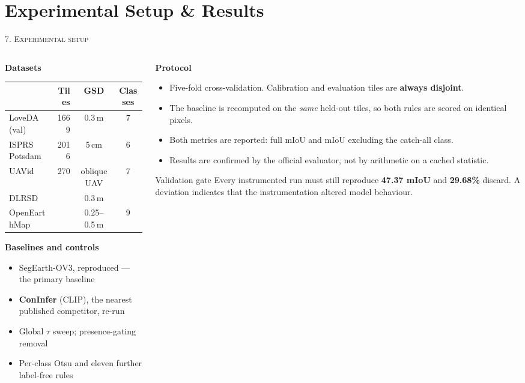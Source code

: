 \documentclass[aspectratio=169]{beamer}
\newcommand{\best}[1]{\textcolor{acc}{\textbf{#1}}}
\begin{document}
\section{Experimental Setup \& Results}
\begin{frame}{\textsc{7. Experimental setup}}
\small
\begin{columns}[T]
\begin{column}{0.50\textwidth}
\textbf{Datasets}
\begin{center}\footnotesize
\begin{tabular}{@{}lrcc@{}}
\toprule
& \textbf{Tiles} & \textbf{GSD} & \textbf{Classes}\\
\midrule
LoveDA (val) & 1669 & 0.3\,m & 7 \\
ISPRS Potsdam & 2016 & 5\,cm & 6 \\
UAVid & 270 & oblique UAV & 7 \\
DLRSD & \dlrTiles{} & 0.3\,m & \dlrClasses{} \\
OpenEarthMap & \oemTiles{} & 0.25--0.5\,m & 9 \\
\bottomrule
\end{tabular}
\end{center}
\vspace{0.5em}
\textbf{Baselines and controls}
\begin{itemize}\footnotesize
  \item SegEarth-OV3, reproduced --- the primary baseline
  \item \best{ConInfer} (CLIP), the nearest published competitor, re-run
  \item Global $\tau$ sweep; presence-gating removal
  \item Per-class Otsu and eleven further label-free rules
\end{itemize}
\end{column}
\begin{column}{0.48\textwidth}
\textbf{Protocol}
\begin{itemize}\footnotesize
  \item Five-fold cross-validation. Calibration and evaluation tiles are
        \best{always disjoint}.
  \item The baseline is recomputed on the \emph{same} held-out tiles, so both
        rules are scored on identical pixels.
  \item Both metrics are reported: full mIoU and mIoU excluding the catch-all
        class.
  \item Results are confirmed by the official evaluator, not by arithmetic on a
        cached statistic.
\end{itemize}
\vspace{0.5em}
\begin{block}{\small Validation gate}
\footnotesize Every instrumented run must still reproduce \best{47.37 mIoU} and
\best{29.68\%} discard. A deviation indicates that the instrumentation altered
model behaviour.
\end{block}
\end{column}
\end{columns}
\end{frame}
\end{document}
